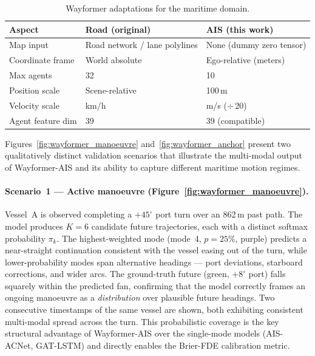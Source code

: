 \documentclass[12pt, a4paper]{article}
\begin{document}
\begin{table}[H]
    \centering
    \caption{Wayformer adaptations for the maritime domain.}
    \label{tab:adaptation}
    \begin{tabular}{lll}
        \toprule
        \textbf{Aspect} & \textbf{Road (original)} & \textbf{AIS (this work)} \\
        \midrule
        Map input         & Road network / lane polylines & None (dummy zero tensor) \\
        Coordinate frame  & World absolute               & Ego-relative (meters) \\
        Max agents        & 32                           & 10 \\
        Position scale    & Scene-relative               & 100\,m \\
        Velocity scale    & km/h                         & m/s ($\div$\,20) \\
        Agent feature dim & 39                           & 39 (compatible) \\
        \bottomrule
    \end{tabular}
\end{table}

  Figures~\ref{fig:wayformer_manoeuvre} and~\ref{fig:wayformer_anchor} present two
  qualitatively distinct validation scenarios that illustrate the multi-modal output
  of Wayformer-AIS and its ability to capture different maritime motion regimes.

  \paragraph{Scenario~1 --- Active manoeuvre (Figure~\ref{fig:wayformer_manoeuvre}).}
  Vessel~A is observed completing a $+45^{\circ}$ port turn over an
  862\,m past path.  The model produces $K=6$ candidate future trajectories, each
  with a distinct softmax probability $\pi_k$.  The highest-weighted mode (mode~4,
  $p=25\%$, purple) predicts a near-straight continuation consistent with the vessel
  easing out of the turn, while lower-probability modes span alternative headings ---
  port deviations, starboard corrections, and wider arcs.  The ground-truth future
  (green, $+8^{\circ}$ port) falls squarely within the predicted fan, confirming that the
  model correctly frames an ongoing manoeuvre as a \emph{distribution} over plausible
  future headings.  Two consecutive timestamps of the same vessel are shown, both
  exhibiting consistent multi-modal spread across the turn.  This probabilistic
  coverage is the key structural advantage of Wayformer-AIS over the single-mode
  models (AIS-ACNet, GAT-LSTM) and directly enables the Brier-FDE calibration metric.
\end{document}
